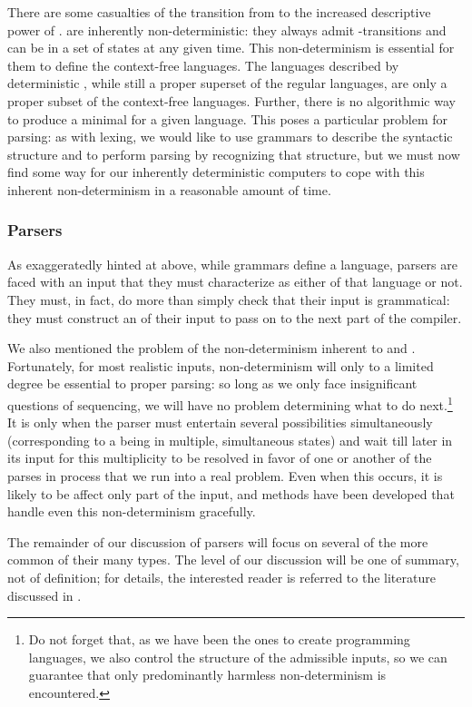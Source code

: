 There are some casualties of the transition from \FAs to the increased descriptive power of \PDAs. \PDAs are inherently non-deterministic: they always admit \emptyword-transitions and can be in a set of states at any given time. This non-determinism is essential for them to define the context-free languages. The languages described by deterministic \PDAs, while still a proper superset of the regular languages, are only a proper subset of the context-free languages. Further, there is no algorithmic way to produce a minimal \PDA for a given language. This poses a particular problem for parsing: as with lexing, we would like to use grammars to describe the syntactic structure and \PDAs to perform parsing by recognizing that structure, but we must now find some way for our inherently deterministic computers to cope with this inherent non-determinism in a reasonable amount of time.

\subsubsection{Parsers}
As exaggeratedly hinted at above, while grammars define a language, parsers are faced with an input that they must characterize as either of that language or not. They must, in fact, do more than simply check that their input is grammatical: they must construct an \IR of their input to pass on to the next part of the compiler.

We also mentioned the problem of the non-determinism inherent to \CFGs and \PDAs. Fortunately, for most realistic inputs, non-determinism will only to a limited degree be essential to proper parsing: so long as we only face insignificant questions of sequencing, we will have no problem determining what to do next.\footnote{Do not forget that, as we have been the ones to create programming languages, we also control the structure of the admissible inputs, so we can guarantee that only predominantly harmless non-determinism is encountered.} It is only when the parser must entertain several possibilities simultaneously (corresponding to a \PDA being in multiple, simultaneous states) and wait till later in its input for this multiplicity to be resolved in favor of one or another of the parses in process that we run into a real problem. Even when this occurs, it is likely to be affect only part of the input, and methods have been developed that handle even this non-determinism gracefully.

The remainder of our discussion of parsers will focus on several of the more common of their many types. The level of our discussion will be one of summary, not of definition; for details, the interested reader is referred to the literature discussed in .


